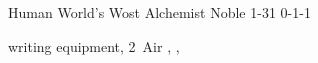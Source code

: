 
\filledCS%
  {\composeHumanName}%
  {Human}%
  {World's Wost Alchemist}%
  {Noble}%
  {{1}{-3}{1}}%
  {{0}{-1}{-1}}%
  {%
    \renewcommand\rank{Fodder}
    \renewcommand\characterDebt{100 \glspl{sp}}

    \renewcommand\charSpells{
      \showSpells{Air1}
      \showSpells{Air1}

      \vspace{\baselineskip}
      \bigLine
      \vspace{\baselineskip}

      These higher level spells may only be cast by using an Air \gls{boon} to raise the Air \gls{sphere} by 1~level.

      \bigLine

      \showSpells{Air2}
      \showSpells{Air3}
    }
    \setcounter{Academics}{2}
    \setcounter{Cultivation}{1}
    \setcounter{Empathy}{1}
    \setcounter{Vigilance}{1}
    \setcounter{Deceit}{1}

    \setcounter{Air}{1}
    \Dagger
    \addtocounter{equipmentWeight}{3}
  }%
  {\ritualcaster}%
  {writing equipment, 2~Air , \rations, }%
